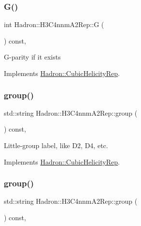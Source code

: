 \subsubsection{\texorpdfstring{G()}{G()}\hspace{0.1cm}{\footnotesize\ttfamily [3/3]}}
{\footnotesize\ttfamily int Hadron\+::\+H3\+C4nnm\+A2\+Rep\+::G (\begin{DoxyParamCaption}{ }\end{DoxyParamCaption}) const\hspace{0.3cm}{\ttfamily [inline]}, {\ttfamily [virtual]}}

G-\/parity if it exists 

Implements \mbox{\hyperlink{structHadron_1_1CubicHelicityRep_a50689f42be1e6170aa8cf6ad0597018b}{Hadron\+::\+Cubic\+Helicity\+Rep}}.

\mbox{\label{structHadron_1_1H3C4nnmA2Rep_a057eae346cf6d906b23501bceef95e9b}} 
\subsubsection{\texorpdfstring{group()}{group()}\hspace{0.1cm}{\footnotesize\ttfamily [1/5]}}
{\footnotesize\ttfamily std\+::string Hadron\+::\+H3\+C4nnm\+A2\+Rep\+::group (\begin{DoxyParamCaption}{ }\end{DoxyParamCaption}) const\hspace{0.3cm}{\ttfamily [inline]}, {\ttfamily [virtual]}}

Little-\/group label, like D2, D4, etc. 

Implements \mbox{\hyperlink{structHadron_1_1CubicHelicityRep_a101a7d76cd8ccdad0f272db44b766113}{Hadron\+::\+Cubic\+Helicity\+Rep}}.

\mbox{\label{structHadron_1_1H3C4nnmA2Rep_a057eae346cf6d906b23501bceef95e9b}} 
\subsubsection{\texorpdfstring{group()}{group()}\hspace{0.1cm}{\footnotesize\ttfamily [2/5]}}
{\footnotesize\ttfamily std\+::string Hadron\+::\+H3\+C4nnm\+A2\+Rep\+::group (\begin{DoxyParamCaption}{ }\end{DoxyParamCaption}) const\hspace{0.3cm}{\ttfamily [inline]}, {\ttfamily [virtual]}}

